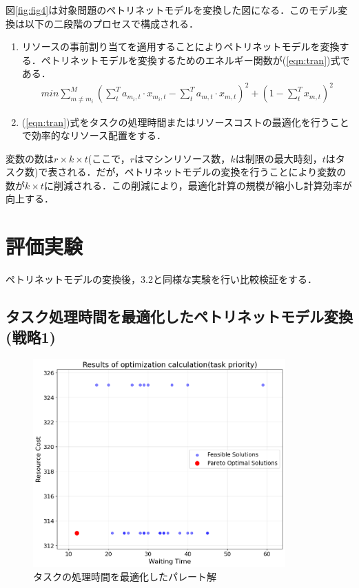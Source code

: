 図\ref{fig:fig4}は対象問題のペトリネットモデルを変換した図になる．このモデル変換は以下の二段階のプロセスで構成される．

\begin{enumerate} 
\item リソースの事前割り当てを適用することによりペトリネットモデルを変換する．ペトリネットモデルを変換するためのエネルギー関数が(\ref{eqn:tran})式である．
\begin{align} 
min \sum_{m \ne m_i}^M \left( \sum_t^T a_{m_i,t} \cdot x_{m_i,t} - \sum_t^T a_{m,t} \cdot x_{m,t}\right)^2 + \left(1 - \sum_t^T x_{m,t} \right)^2 \label{eqn:tran} 
\end{align}

\item (\ref{eqn:tran})式をタスクの処理時間またはリソースコストの最適化を行うことで効率的なリソース配置をする．
\end{enumerate}

変数の数は$r \times k \times t$(ここで，$r$はマシンリソース数，$k$は制限の最大時刻，$t$はタスク数)で表される．だが，ペトリネットモデルの変換を行うことにより変数の数が$k \times t$に削減される．この削減により，最適化計算の規模が縮小し計算効率が向上する．

\section{評価実験}
ペトリネットモデルの変換後，3.2と同様な実験を行い比較検証をする．

\subsection{タスク処理時間を最適化したペトリネットモデル変換(戦略1)}

\begin{figure}[H]
    \centering
    \includegraphics[width=0.8\linewidth, height=8cm]{./images/task.png}
    \caption{タスクの処理時間を最適化したパレート解}
    \label{fig:fig5}
\end{figure}


